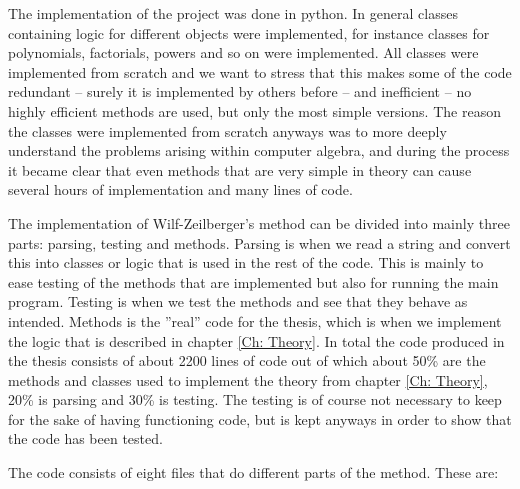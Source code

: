 The implementation of the project was done in python. In general classes containing logic for different objects were implemented, for instance classes for polynomials, factorials, powers and so on were implemented. All classes were implemented from scratch and we want to stress that this makes some of the code redundant -- surely it is implemented by others before -- and inefficient -- no highly efficient methods are used, but only the most simple versions. The reason the classes were implemented from scratch anyways was to more deeply understand the problems arising within computer algebra, and during the process it became clear that even methods that are very simple in theory can cause several hours of implementation and many lines of code.

The implementation of Wilf-Zeilberger's method can be divided into mainly three parts: parsing, testing and methods. Parsing is when we read a string and convert this into classes or logic that is used in the rest of the code. This is mainly to ease testing of the methods that are implemented but also for running the main program. Testing is when we test the methods and see that they behave as intended. Methods is the ''real'' code for the thesis, which is when we implement the logic that is described in chapter \ref{Ch: Theory}. In total the code produced in the thesis consists of about 2200 lines of code out of which about 50\% are the methods and classes used to implement the theory from chapter \ref{Ch: Theory}, 20\% is parsing and 30\% is testing. The testing is of course not necessary to keep for the sake of having functioning code, but is kept anyways in order to show that the code has been tested.

The code consists of eight files that do different parts of the method. These are:

